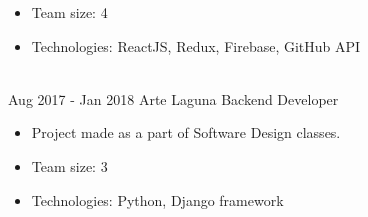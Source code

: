 \documentclass[letterpaper]{tenseconds} %
\begin{document}
\begin{twenty}
{\begin{itemize}
			\item Team size: 4
			\item Technologies: ReactJS, Redux, Firebase, GitHub API
		\end{itemize}}
	\\
	\twentyitem
	{Aug 2017 -}
	{Jan 2018}
	{Arte Laguna \href{https://github.com/kk0walski/konkurs}{\faGithub}}
	{Backend Developer}
	{}
	{\begin{itemize}
			\item Project made as a part of Software Design classes.
			\item Team size: 3
			\item Technologies: Python, Django framework
		\end{itemize}}
\end{twenty}

\end{document}
